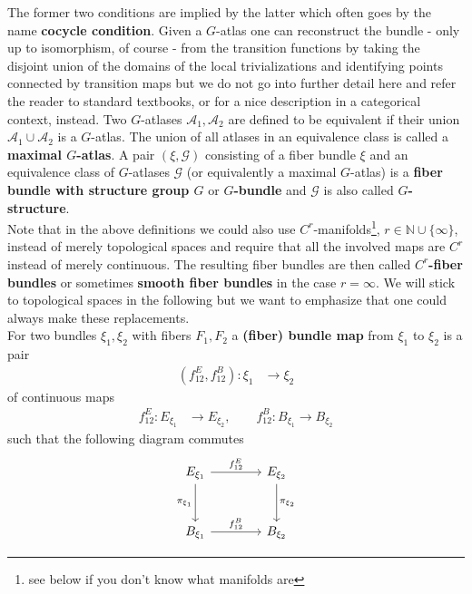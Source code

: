 The former two conditions are implied by the latter which often goes by the name \textbf{cocycle condition}. Given a $G$-atlas one can reconstruct the bundle - only up to isomorphism, of course - from the transition functions by taking the disjoint union of the domains of the local trivializations and identifying points connected by transition maps but we do not go into further detail here and refer the reader to standard textbooks, or \cite{00000001} for a nice description in a categorical context, instead. Two $G$-atlases $\mathcal{A}_{1},\mathcal{A}_{2}$ are defined to be equivalent if their union $\mathcal{A}_{1} \cup \mathcal{A}_{2}$ is a $G$-atlas. The union of all atlases in an equivalence class is called a \textbf{maximal $G$-atlas}. A pair $(\xi,\mathcal{G})$ consisting of a fiber bundle $\xi$ and an equivalence class of $G$-atlases $\mathcal{G}$ (or equivalently a maximal $G$-atlas) is a \textbf{fiber bundle with structure group $G$} or \textbf{$G$-bundle} and $\mathcal{G}$ is also called \textbf{$G$-structure}.
\\
Note that in the above definitions we could also use $C^{r}$-manifolds\footnote{see below if you don't know what manifolds are}, $r \in \mathbb{N} \cup \lbrace \infty \rbrace$, instead of merely topological spaces and require that all the involved maps are $C^{r}$ instead of merely continuous. The resulting fiber bundles are then called \textbf{$C^{r}$-fiber bundles} or sometimes \textbf{smooth fiber bundles} in the case $r = \infty$. We will stick to topological spaces in the following but we want to emphasize that one could always make these replacements.
\\
For two bundles $\xi_{1},\xi_{2}$ with fibers $F_{1},F_{2}$ a \textbf{(fiber) bundle map} from $\xi_{1}$ to $\xi_{2}$ is a pair
\begin{align*}
  (f_{12}^{E},f_{12}^{B})
  \colon
  \xi_{1}
  &\to
  \xi_{2}
\end{align*}
of continuous maps
\begin{align*}
  f_{12}^{E}
  \colon
  E_{\xi_{1}}
  &\to
  E_{\xi_{2}}
  ,\qquad
  f_{12}^{B}
  \colon
  B_{\xi_{1}}
  \to
  B_{\xi_{2}}
\end{align*}
such that the following diagram commutes
\begin{equation*}
\begin{tikzcd}[row sep=3em,column sep=4em]
  E_{\xi_{1}}
  \ar{r}{f_{12}^{E}}
  \ar{d}[swap]{\pi_{\xi_{1}}}
  &
  E_{\xi_{2}}
  \ar{d}{\pi_{\xi_{2}}}
  \\
  B_{\xi_{1}}
  \ar{r}{f_{12}^{B}}
  &
  B_{\xi_{2}}
\end{tikzcd}
\end{equation*}
